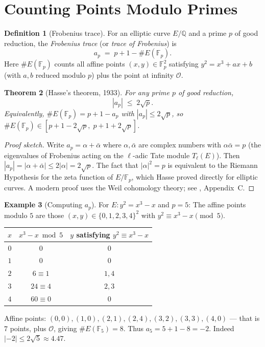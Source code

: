 \documentclass[12pt,a4paper]{amsart}
\newtheorem{theorem}{Theorem}[section]
\theoremstyle{definition}
\newtheorem{definition}[theorem]{Definition}
\newtheorem{example}[theorem]{Example}
\newcommand{\Q}{\mathbb{Q}}
\newcommand{\Fp}{\mathbb{F}_p}
\begin{document}
\section{Counting Points Modulo Primes}

\begin{definition}[Frobenius trace]
\label{def:ap}
For an elliptic curve $E/\Q$ and a prime $p$ of good reduction, the
\emph{Frobenius trace} (or \emph{trace of Frobenius}) is
\[
  a_p \;=\; p + 1 - \#E(\Fp).
\]
Here $\#E(\Fp)$ counts all affine points $(x,y) \in \Fp^2$ satisfying
$y^2 = x^3 + ax + b$ (with $a, b$ reduced modulo $p$) plus the point
at infinity $\mathcal{O}$.
\end{definition}

\begin{theorem}[Hasse's theorem, 1933]
\label{thm:hasse}
For any prime $p$ of good reduction,
\[
  |a_p| \;\le\; 2\sqrt{p}.
\]
Equivalently, $\#E(\Fp) = p + 1 - a_p$ with $|a_p| \le 2\sqrt{p}$,
so $\#E(\Fp) \in [p + 1 - 2\sqrt{p},\; p + 1 + 2\sqrt{p}]$.
\end{theorem}

\begin{proof}[Proof sketch]
Write $a_p = \alpha + \bar\alpha$ where $\alpha, \bar\alpha$ are
complex numbers with $\alpha \bar\alpha = p$ (the eigenvalues of
Frobenius acting on the $\ell$-adic Tate module $T_\ell(E)$).
Then $|a_p| = |\alpha + \bar\alpha| \le 2|\alpha| = 2\sqrt{p}$.
The fact that $|\alpha|^2 = p$ is equivalent to the Riemann Hypothesis
for the zeta function of $E/\Fp$, which Hasse proved directly for
elliptic curves.
A modern proof uses the Weil cohomology theory; see \cite{Silverman1986},
Appendix~C.
\end{proof}

\begin{example}[Computing $a_p$]
\label{ex:ap}
For $E: y^2 = x^3 - x$ and $p = 5$:
The affine points modulo $5$ are those $(x,y) \in \{0,1,2,3,4\}^2$ with
$y^2 \equiv x^3 - x \pmod 5$.
\begin{center}
\begin{tabular}{c|c|c}
  $x$ & $x^3 - x \bmod 5$ & $y$ satisfying $y^2 \equiv x^3-x$ \\
  \hline
  $0$ & $0$ & $0$ \\
  $1$ & $0$ & $0$ \\
  $2$ & $6 \equiv 1$ & $1, 4$ \\
  $3$ & $24 \equiv 4$ & $2, 3$ \\
  $4$ & $60 \equiv 0$ & $0$
\end{tabular}
\end{center}
Affine points: $(0,0), (1,0), (2,1), (2,4), (3,2), (3,3), (4,0)$ --- that is $7$ points,
plus $\mathcal{O}$, giving $\#E(\mathbb{F}_5) = 8$.
Thus $a_5 = 5 + 1 - 8 = -2$.  Indeed $|-2| \le 2\sqrt{5} \approx 4.47$. \checkmark
\end{example}
\end{document}
